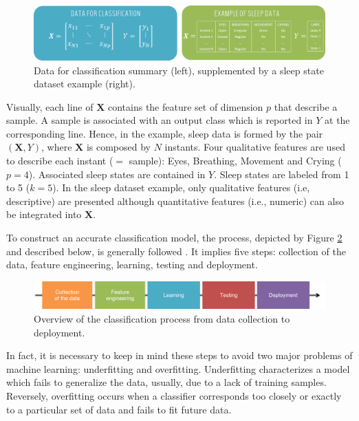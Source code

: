 \documentclass[a4paper,10pt]{article}
\begin{document}
\begin{figure}[htbp]
\centerline{\includegraphics[width=\linewidth]{./figures/data.png}}
\caption{Data for classification summary (left), supplemented by a sleep state dataset example (right).}
\label{dataForm}
\end{figure}

Visually, each line of $\bm{X}$ contains the feature set of dimension $p$ that describe a sample. A sample is associated with an output class which is reported in $Y$ at the corresponding line. Hence, in the example, sleep data is formed by the pair $(\bm{X},Y)$, where $\bm{X}$ is composed by $N$ instants. Four qualitative features are used to describe each instant ($=$ sample): Eyes, Breathing, Movement and Crying ($p=4$). Associated sleep states are contained in $Y$. Sleep states are labeled from 1 to 5 ($k=5$).
In the sleep dataset example, only qualitative features (i.e, descriptive) are presented although quantitative features (i.e., numeric) can also be integrated into $\bm{X}$.

To construct an accurate classification model, the process, depicted by Figure \ref{processML} and described below, is generally followed \cite{dangeti2017statistics}. It implies five steps: collection of the data, feature engineering, learning, testing and deployment.

\begin{figure}[htbp]
\centerline{\includegraphics[width=\linewidth]{./figures/process.png}}
\caption{Overview of the classification process from data collection to deployment.}
\label{processML}
\end{figure}

In fact, it is necessary to keep in mind these steps to avoid two major problems of machine learning: underfitting and overfitting.
Underfitting characterizes a model which fails to generalize the data, usually, due to a lack of training samples. Reversely, overfitting occurs when a classifier corresponds too closely or exactly to a particular set of data and fails to fit future data.
\end{document}

